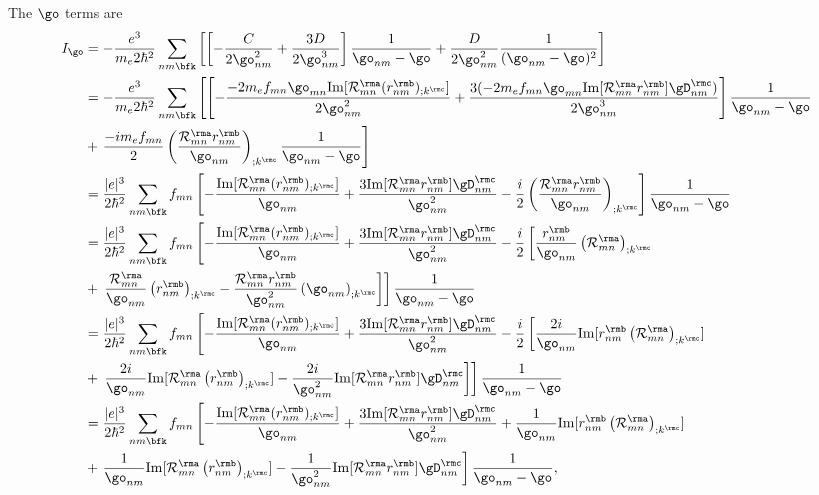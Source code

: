 The $\go$ terms are
\begin{align}\label{pfia}
I_{\go}
&=
-\frac{e^3}{m_e2\hbar^2}
\sum_{nm\bfk}
\left[
\left[
-\frac{C}{2\go^2_{nm}}
+
\frac{3D}{2\go^3_{nm}}
\right]\frac{1}{\go_{nm}-\go}
+
\frac{D}{2\go^2_{nm}}\frac{1}{(\go_{nm}-\go)^2}
\right]
\nonumber\\
&=
-\frac{e^3}{m_e2\hbar^2}
\sum_{nm\bfk}
\left[
\left[
-\frac{-2m_ef_{mn}\go_{mn}\mathrm{Im}[{\cal R}^{\rma}_{mn}(r^{\rmb}_{nm})_{;k^{\rmc}}]
}{2\go^2_{nm}}
+
\frac{3(-2m_ef_{mn}\go_{mn}\mathrm{Im}[{\cal R}^{\rma}_{mn}r^{\rmb}_{nm}]\gD^{\rmc}_{nm})}{2\go^3_{nm}}
\right]\frac{1}{\go_{nm}-\go}
\right.
\nonumber\\
&+
\left.
\frac{-im_ef_{mn}}{2}
\left(
\frac{{\cal R}^{\rma}_{mn}r^{\rmb}_{nm}}{\go_{nm}}
\right)_{;k^{\rmc}}
\frac{1}{\go_{nm}-\go}
\right]
\nonumber\\
&=
\frac{|e|^3}{2\hbar^2}
\sum_{nm\bfk}
f_{mn}
\left[
-\frac{\mathrm{Im}[{\cal R}^{\rma}_{mn}(r^{\rmb}_{nm})_{;k^{\rmc}}]
}{\go_{nm}}
+
\frac{3\mathrm{Im}[{\cal R}^{\rma}_{mn}r^{\rmb}_{nm}]\gD^{\rmc}_{nm}}{\go^2_{nm}}
-
\frac{i}{2}
\left(
\frac{{\cal R}^{\rma}_{mn}r^{\rmb}_{nm}}{\go_{nm}}
\right)_{;k^{\rmc}}
\right]\frac{1}{\go_{nm}-\go}
\nonumber\\
&=
\frac{|e|^3}{2\hbar^2}
\sum_{nm\bfk}
f_{mn}
\left[
-\frac{\mathrm{Im}[{\cal R}^{\rma}_{mn}(r^{\rmb}_{nm})_{;k^{\rmc}}]
}{\go_{nm}}
+
\frac{3\mathrm{Im}[{\cal R}^{\rma}_{mn}r^{\rmb}_{nm}]\gD^{\rmc}_{nm}}{\go^2_{nm}}
-
\frac{i}{2}
\left[
\frac{r^{\rmb}_{nm}}{\go_{nm}}
\left(
{\cal R}^{\rma}_{mn}
\right)_{;k^{\rmc}}
\right.
\right.
\nonumber\\
&+
\left.
\left.
\frac{{\cal R}^{\rma}_{mn}}{\go_{nm}}
\left(
r^{\rmb}_{nm}
\right)_{;k^{\rmc}}
-
\frac{{\cal R}^{\rma}_{mn}r^{\rmb}_{nm}}{\go^2_{nm}}
\left(
\go_{nm}
\right)_{;k^{\rmc}}
\right]
\right]
\frac{1}{\go_{nm}-\go}
\nonumber\\
&=
\frac{|e|^3}{2\hbar^2}
\sum_{nm\bfk}
f_{mn}
\left[
-\frac{\mathrm{Im}[{\cal R}^{\rma}_{mn}(r^{\rmb}_{nm})_{;k^{\rmc}}]
}{\go_{nm}}
+
\frac{3\mathrm{Im}[{\cal R}^{\rma}_{mn}r^{\rmb}_{nm}]\gD^{\rmc}_{nm}}{\go^2_{nm}}
-
\frac{i}{2}
\left[
\frac{2i}{\go_{nm}}
\mathrm{Im}[r^{\rmb}_{nm}\left({\cal R}^{\rma}_{mn}\right)_{;k^{\rmc}}]
\right.
\right.
\nonumber\\
&+
\left.
\left.
\frac{2i}{\go_{nm}}
\mathrm{Im}[
{\cal R}^{\rma}_{mn}
\left(
r^{\rmb}_{nm}
\right)_{;k^{\rmc}}
]
-
\frac{2i}{\go^2_{nm}}
\mathrm{Im}[{\cal R}^{\rma}_{mn}r^{\rmb}_{nm}]
\gD^{\rmc}_{nm}
\right]
\right]
\frac{1}{\go_{nm}-\go}
\nonumber\\
&=
\frac{|e|^3}{2\hbar^2}
\sum_{nm\bfk}
f_{mn}
\left[
-\frac{\mathrm{Im}[{\cal R}^{\rma}_{mn}(r^{\rmb}_{nm})_{;k^{\rmc}}]
}{\go_{nm}}
+
\frac{3\mathrm{Im}[{\cal R}^{\rma}_{mn}r^{\rmb}_{nm}]\gD^{\rmc}_{nm}}{\go^2_{nm}}
+
\frac{1}{\go_{nm}}
\mathrm{Im}[r^{\rmb}_{nm}\left({\cal R}^{\rma}_{mn}\right)_{;k^{\rmc}}]
\right.
\nonumber\\
&+
\left.
\frac{1}{\go_{nm}}
\mathrm{Im}[
{\cal R}^{\rma}_{mn}
\left(
r^{\rmb}_{nm}
\right)_{;k^{\rmc}}
]
-
\frac{1}{\go^2_{nm}}
\mathrm{Im}[{\cal R}^{\rma}_{mn}r^{\rmb}_{nm}]
\gD^{\rmc}_{nm}
\right]
\frac{1}{\go_{nm}-\go}
,
\end{align}
